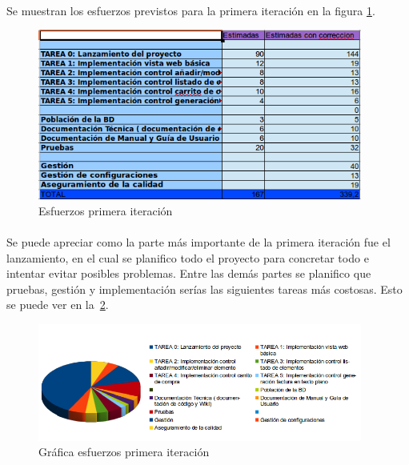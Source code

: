 

\paragraph{} Se muestran los esfuerzos previstos para la primera iteración en la figura \ref{fig:6141}.

\begin{figure}[h!]
\centering
\includegraphics[width=0.95\textwidth]{img/6141}
\caption{Esfuerzos primera iteración}
 \label{fig:6141}
\end{figure}

\paragraph{} Se puede apreciar como la parte más importante de la primera iteración fue el lanzamiento, en el cual se planifico todo el proyecto para concretar todo e intentar evitar posibles problemas. Entre las demás partes se planifico que pruebas, gestión y implementación serías las siguientes tareas más costosas. Esto se puede ver en la~\cref{fig:6142}.

\begin{figure}[h!]
\centering
\includegraphics[width=0.95\textwidth]{img/6142}
\caption{Gráfica esfuerzos primera iteración}
 \label{fig:6142}
\end{figure}

